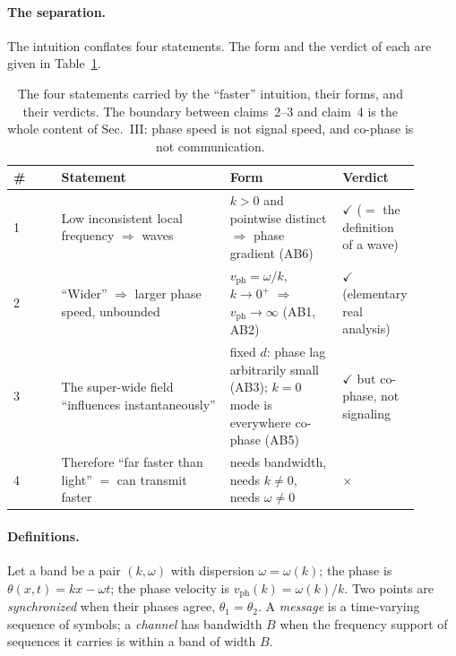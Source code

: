\documentclass[aps,prd,preprint,superscriptaddress,amsmath,amssymb]{revtex4-2}
\begin{document}
\paragraph{The separation.}
The intuition conflates four statements.  The form and the verdict of
each are given in Table~\ref{tab:claims}.

\begin{table}[ht]
\caption{The four statements carried by the ``faster'' intuition, their
forms, and their verdicts.  The boundary between claims~2--3 and
claim~4 is the whole content of Sec.~III: phase speed is not signal
speed, and co-phase is not communication.}
\label{tab:claims}
\begin{ruledtabular}
\begin{tabular}{p{0.12\linewidth}p{0.42\linewidth}p{0.28\linewidth}p{0.08\linewidth}}
\# & Statement & Form & Verdict \\
\hline
1 & Low inconsistent local frequency $\Rightarrow$ waves & $k>0$ and
pointwise distinct $\Rightarrow$ phase gradient (AB6) &
$\checkmark$ ($=$ the definition of a wave)\\
2 & ``Wider'' $\Rightarrow$ larger phase speed, unbounded &
$v_{\mathrm{ph}}=\omega/k$, $k\to0^{+}$ $\Rightarrow$
$v_{\mathrm{ph}}\to\infty$ (AB1, AB2) & $\checkmark$ (elementary
real analysis)\\
3 & The super-wide field ``influences instantaneously'' & fixed $d$:
phase lag arbitrarily small (AB3); $k=0$ mode is everywhere co-phase
(AB5) & $\checkmark$ but co-phase, not signaling\\
4 & Therefore ``far faster than light'' $=$ can transmit faster &
needs bandwidth, needs $k\ne0$, needs $\omega\ne0$ & $\times$\\
\end{tabular}
\end{ruledtabular}
\end{table}

\paragraph{Definitions.}
Let a band be a pair $(k,\omega)$ with dispersion
$\omega=\omega(k)$; the phase is $\theta(x,t)=kx-\omega t$; the phase
velocity is $v_{\mathrm{ph}}(k)=\omega(k)/k$.  Two points are
\emph{synchronized} when their phases agree, $\theta_1=\theta_2$.
A \emph{message} is a time-varying sequence of symbols; a
\emph{channel} has bandwidth $B$ when the frequency support of
sequences it carries is within a band of width $B$.
\end{document}
